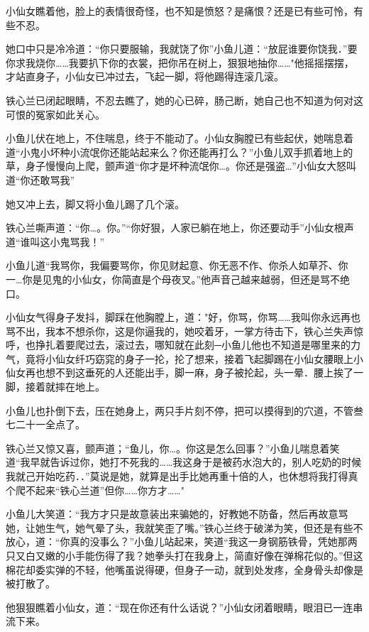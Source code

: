 \documentclass[12pt,oneside]{book}
\begin{document}
小仙女瞧着他，脸上的表情很奇怪，也不知是愤怒？是痛恨？还是已有些可怜，有些不忍。

她口中只是冷冷道：``你只要服输，我就饶了你''小鱼儿道：``放屁谁要你饶我．''要你求我烧你\ldots\ldots 我要扒下你的衣裳，把你吊在树上，狠狠地抽你\ldots\ldots"他摇摇摆摆，才站直身子，小仙女已冲过去，飞起一脚，将他踢得连滚几滚。

铁心兰已闭起眼睛，不忍去瞧了，她的心已碎，肠己断，她自己也不知道为何对这可恨的冤家如此关心。

小鱼儿伏在地上，不住喘息，终于不能动了。小仙女胸膛已有些起伏，她喘息着道``小鬼小坏种小流氓你还能站起来么？你还能再打么？''小鱼儿双手抓着地上的草，身子慢慢向上爬，颤声道``你才是坏种流氓你\ldots。你还是强盗\ldots{}''小仙女大怒叫道``你还敢骂我''

她又冲上去，脚又将小鱼儿踢了几个滚。

铁心兰嘶声道：``你\ldots。你。''``你好狠，人家已躺在地上，你还要动手''小仙女根声道``谁叫这小鬼骂我！''

小鱼儿道``我骂你，我偏要骂你，你见财起意、你无恶不作、你杀人如草芥、你一\ldots 你是见鬼的小仙女，你简直是个母夜叉。''他声音己越来越弱，但还是骂不绝口。

小仙女气得身子发抖，脚踩在他胸膛上，道："好，你骂，你骂\ldots\ldots 我叫你永远再也骂不出，我本不想杀你，这是你逼我的，她咬着牙，一掌方待击下，铁心兰失声惊呼，也挣扎着要爬过去，滚过去，哪知就在此刻─小鱼儿他也不知道是哪里来的力气，竟将小仙女纤巧窈窕的身子一抡，抡了想来，接着飞起脚踢在小仙女腰眼上小仙女再也想不到这垂死的人还能出手，脚一麻，身子被抡起，头一晕．腰上挨了一脚，接着就摔在地上。

小鱼儿也扑倒下去，压在她身上，两只手片刻不停，把可以摸得到的穴道，不管叁七二十一全点了。

铁心兰又惊又喜，颤声道；``鱼儿，你\ldots。你这是怎么回事？''小鱼儿喘息着笑道``我早就告诉过你，她打不死我的\ldots\ldots 我这身于是被药水泡大的，别人吃奶的时候我就己开始吃药．．''莫说是她，就算是出手比她再重十倍的人，也休想将我打得真个爬不起来``铁心兰道''但你\ldots\ldots 你方才\ldots\ldots"

小鱼儿大笑道：``我方才只是故意装出来骗她的，好教她不防备，然后再故意骂她，让她生气，她气晕了头，我就笑歪了嘴。''铁心兰终于破涕为笑，但还是有些不放心，道：``你真的没事么？''小鱼儿站起来，笑道``我这一身钢筋铁骨，凭她那两只又白又嫩的小手能伤得了我？她拳头打在我身上，简直好像在弹棉花似的。''但这棉花却委实弹的不轻，他嘴虽说得硬，但身子一动，就到处发疼，全身骨头却像是被打散了。

他狠狠瞧着小仙女，道：``现在你还有什么话说？''小仙女闭着眼睛，眼泪已一连串流下来。
\end{document}
